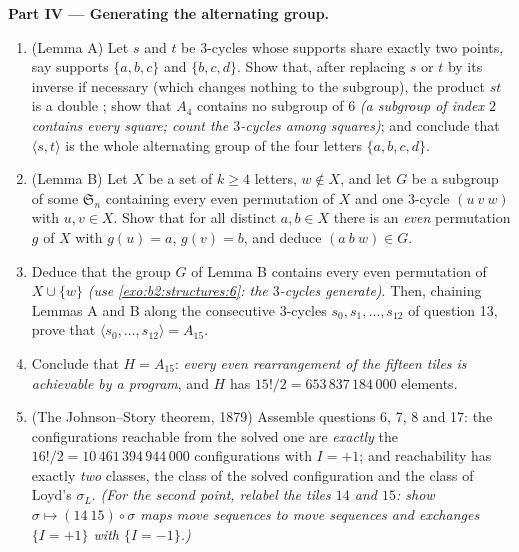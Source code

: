 \begin{problem}
\medskip
\noindent\textbf{Part IV --- Generating the alternating group.}
\begin{enumerate}[resume]
  \item (Lemma A) Let $s$ and $t$ be $3$-cycles whose supports
        share exactly two points, say supports $\{a, b, c\}$ and
        $\{b, c, d\}$. Show that, after replacing $s$ or $t$ by
        its inverse if necessary (which changes nothing to the
         subgroup), the product $st$ is a double
        ; show that $A_4$ contains no subgroup of
         $6$ \emph{(a subgroup of index $2$ contains every
        square; count the $3$-cycles among squares)}; and conclude
        that $\langle s, t\rangle$ is the whole alternating group
        of the four letters $\{a, b, c, d\}$.
  \item (Lemma B) Let $X$ be a set of $k \geq 4$ letters, $w
        \notin X$, and let $G$ be a subgroup of some
        $\mathfrak{S}_n$ containing every even permutation of $X$
        and one $3$-cycle $(u\ v\ w)$ with $u, v \in X$. Show that
        for all distinct $a, b \in X$ there is an \emph{even}
        permutation $g$ of $X$ with $g(u) = a$, $g(v) = b$, and
        deduce $(a\ b\ w) \in G$.
  \item Deduce that the group $G$ of Lemma B contains every even
        permutation of $X \cup \{w\}$ \emph{(use
        \cref{exo:b2:structures:6}: the $3$-cycles generate)}.
        Then, chaining Lemmas A and B along the consecutive
        $3$-cycles $s_0, s_1, \dots, s_{12}$ of question 13,
        prove that $\langle s_0, \dots, s_{12}\rangle = A_{15}$.
  \item Conclude that $H = A_{15}$: \emph{every even rearrangement
        of the fifteen tiles is achievable by a program}, and $H$
        has $15!/2 = 653\,837\,184\,000$ elements.
  \item (The Johnson--Story theorem, 1879) Assemble questions 6,
        7, 8 and 17: the configurations reachable from the solved
        one are \emph{exactly} the $16!/2 =
        10\,461\,394\,944\,000$ configurations with $I = +1$;
        and reachability has exactly \emph{two} classes, the class
        of the solved configuration and the class of Loyd's
        $\sigma_L$. \emph{(For the second point, relabel the tiles
        $14$ and $15$: show $\sigma \mapsto (14\ 15) \circ
        \sigma$ maps move sequences to move sequences and
        exchanges $\{I = +1\}$ with $\{I = -1\}$.)}
\end{enumerate}


\end{problem}
